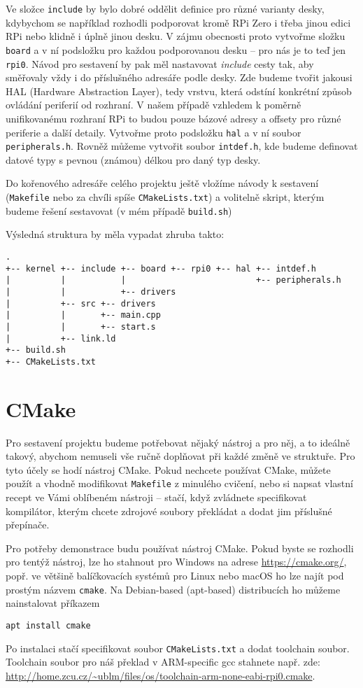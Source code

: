 \documentclass{article}
\begin{document}
Ve složce \texttt{include} by bylo dobré oddělit definice pro různé varianty desky, kdybychom se například rozhodli podporovat kromě RPi Zero i třeba jinou edici RPi nebo klidně i úplně jinou desku. V zájmu obecnosti proto vytvořme složku \texttt{board} a v ní podsložku pro každou podporovanou desku -- pro nás je to teď jen \texttt{rpi0}. Návod pro sestavení by pak měl nastavovat \emph{include} cesty tak, aby směřovaly vždy i do příslušného adresáře podle desky. Zde budeme tvořit jakousi HAL (Hardware Abstraction Layer), tedy vrstvu, která odstíní konkrétní způsob ovládání periferií od rozhraní. V našem případě vzhledem k poměrně unifikovanému rozhraní RPi to budou pouze bázové adresy a offsety pro různé periferie a další detaily. Vytvořme proto podsložku \texttt{hal} a v ní soubor \texttt{peripherals.h}. Rovněž můžeme vytvořit soubor \texttt{intdef.h}, kde budeme definovat datové typy s pevnou (známou) délkou pro daný typ desky.

Do kořenového adresáře celého projektu ještě vložíme návody k sestavení (\texttt{Makefile} nebo za chvíli spíše \texttt{CMakeLists.txt}) a volitelně skript, kterým budeme řešení sestavovat (v mém případě \texttt{build.sh})

Výsledná struktura by měla vypadat zhruba takto:

\begin{verbatim}
.
+-- kernel +-- include +-- board +-- rpi0 +-- hal +-- intdef.h
|          |           |                          +-- peripherals.h
|          |           +-- drivers
|          +-- src +-- drivers
|          |       +-- main.cpp
|          |       +-- start.s
|          +-- link.ld
+-- build.sh
+-- CMakeLists.txt
\end{verbatim}

\section{CMake}

Pro sestavení projektu budeme potřebovat nějaký nástroj a  pro něj, a to ideálně takový, abychom nemuseli vše ručně doplňovat při každé změně ve struktuře. Pro tyto účely se hodí nástroj CMake. Pokud nechcete používat CMake, můžete použít a vhodně modifikovat \texttt{Makefile} z minulého cvičení, nebo si napsat vlastní recept ve Vámi oblíbeném nástroji -- stačí, když zvládnete specifikovat kompilátor, kterým chcete zdrojové soubory překládat a dodat jim příslušné přepínače.

Pro potřeby demonstrace budu používat nástroj CMake. Pokud byste se rozhodli pro tentýž nástroj, lze ho stahnout pro Windows na adrese \url{https://cmake.org/}, popř. ve většině balíčkovacích systémů pro Linux nebo macOS ho lze najít pod prostým názvem \texttt{cmake}. Na Debian-based (apt-based) distribucích ho můžeme nainstalovat příkazem
\begin{verbatim}
apt install cmake
\end{verbatim}
Po instalaci stačí specifikovat soubor \texttt{CMakeLists.txt} a dodat toolchain soubor. Toolchain soubor pro náš překlad v ARM-specific gcc stahnete např. zde: \url{http://home.zcu.cz/~ublm/files/os/toolchain-arm-none-eabi-rpi0.cmake}.
\end{document}
